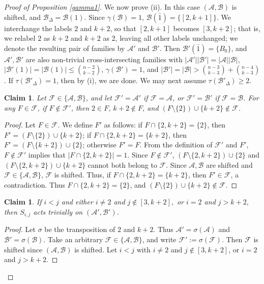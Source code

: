 \documentclass[a4paper,11pt]{article}
\newtheorem{claim}[theorem]{Claim}
\newcommand{\m}{\mathcal}
\begin{document}
\begin{proof}[Proof of Proposition \ref{gamma1}]
We now prove (ii). In this case $(\mathcal A,\mathcal B)$ is shifted, and $\m B_{\Delta}=\m B(1)$. Since $\gamma(\m B)=1$, $\m B(\bar{1})=\{[2,k+1]\}$. 
We interchange the labels $2$ and $k+2$, so that $[2,k+1]$ becomes $[3,k+2]$;
that is, we relabel $2$ as $k+2$ and $k+2$ as $2$, leaving all other labels unchanged; we denote the resulting pair of families by $\m A'$ and $\m B'$. 
Then $\m B'(\bar1)=\{B_0\}$, and $\m A', \m B'$ are also non-trivial cross-intersecting families with $|\m A'||\m B'|=|\m A||\m B|$, $|\m B'(1)|=|\m B(1)|\le{n-2\choose k-2}$, $\gamma(\m B')=1$, and $|\m B'|=|\m B|>{n-3\choose k-3}+{n-4\choose k-3}$.
If $\tau(\m B'_{\Delta})=1$, then by (i), we are done. We may next assume $\tau(\m B'_{\Delta})\ge 2$.


\begin{claim}\label{FF'}
Let $\m F\in \{\m A, \m B\}$, and let $\m F'=\m A'$ if $\m F=\m A$, or $\m F'=\m B'$ if $\m F=\m B$. For any $F\in \m F$, if $F\notin \m F'$, then $2\in F$, $k+2\notin F$, and $(F\setminus \{2\})\cup \{k+2\}\notin \m F$.
\end{claim}

\begin{proof}
Let $F\in \m F$. We define $F'$ as follows: if $F\cap \{2,k+2\}=\{2\}$, then $F'=(F\setminus \{2\})\cup \{k+2\}$; if $F\cap \{2,k+2\}=\{k+2\}$, then $F'=(F\setminus \{k+2\})\cup \{2\}$; otherwise $F'=F$.
From the definition of $\m F'$ and $F'$, $F\notin \m F'$ implies that $|F\cap \{2,k+2\}|=1$. 
Since $F\notin \m F'$, $(F\setminus \{2,k+2\})\cup \{2\}$ and $(F\setminus \{2,k+2\})\cup \{k+2\}$ cannot both belong to $\m F$. 
Since $\m A, \m B$ are shifted and $\m F\in \{\m A, \m B\}$, $\m F$ is shifted.
Thus, if $F\cap \{2,k+2\}=\{k+2\}$, then $F'\in \m F$, a contradiction. Thus $F\cap \{2,k+2\}=\{2\}$, and $(F\setminus \{2\})\cup \{k+2\}\notin \m F$.
\end{proof}

\begin{claim}\label{ijstable}
If $i<j$ and either $i\ne2$ and $j\notin[3,k+2],$ or $i=2$ and $j>k+2,$ 
then $S_{i,j}$ acts trivially on
$(\mathcal A',\mathcal B')$.
\end{claim}

\begin{proof}
Let $\sigma$ be the transposition of $2$ and $k+2$. Thus
$\m A'=\sigma(\m A)$ and $\m B'=\sigma(\m B)$.
Take an arbitrary $\m F\in\{\m A,\m B\}$, and write
$\m F':=\sigma(\m F)$. Then $\m F$ is
shifted since $(\m A,\m B)$ is shifted.
Let $i<j$ with $i\ne 2$ and $j\notin [3,k+2]$,  or $i=2$ and $j>k+2$. 


\end{proof}
\end{proof}
\end{document}
